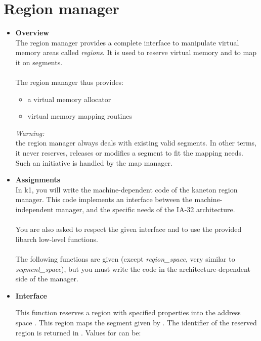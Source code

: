 \section{Region manager}
\begin{itemize}
  \item {\bf Overview}\\
    The region manager provides a complete interface to manipulate virtual memory
    areas called {\em regions}. It is used to reserve virtual memory and to map it
    on segments.\\
    \\
    The region manager thus provides:

    \begin{itemize}
      \item a virtual memory allocator
      \item virtual memory mapping routines\\
    \end{itemize}

    {\em Warning:}\\
    the region manager always deals with existing valid segments. In
    other terms, it never reserves, releases or modifies a segment to fit the mapping
    needs. Such an initiative is handled by the map manager.\\

  \item {\bf Assignments}\\
    In k1, you will write the machine-dependent code of the kaneton region manager.
    This code implements an interface between the machine-independent manager, and
    the specific needs of the IA-32 architecture.\\
    \\
    You are also asked to respect the given interface and to use the provided
    libarch low-level functions.\\
    \\
    The following functions are given (except \emph{region\_space}, very similar to \emph{segment\_space}), but you must write the code in
    the architecture-dependent side of the manager.

  \item {\bf Interface}\\
	 {
	   This function reserves a region with specified properties
	   into the address space . This region maps the
	   segment given by . The identifier of the reserved region is returned in . Values for  can be:

}
\end{itemize}
